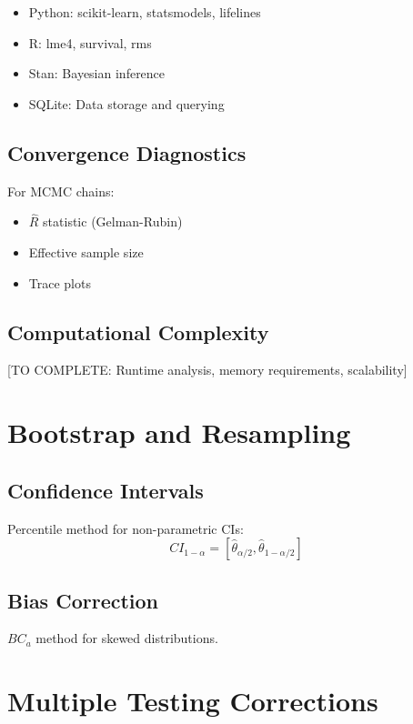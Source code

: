\begin{itemize}
\item Python: scikit-learn, statsmodels, lifelines
\item R: lme4, survival, rms
\item Stan: Bayesian inference
\item SQLite: Data storage and querying
\end{itemize}

\subsection{Convergence Diagnostics}

For MCMC chains:
\begin{itemize}
\item $\hat{R}$ statistic (Gelman-Rubin)
\item Effective sample size
\item Trace plots
\end{itemize}

\subsection{Computational Complexity}

[TO COMPLETE: Runtime analysis, memory requirements, scalability]

\section{Bootstrap and Resampling}

\subsection{Confidence Intervals}

Percentile method for non-parametric CIs:
\begin{equation}
CI_{1-\alpha} = [\hat{\theta}_{\alpha/2}, \hat{\theta}_{1-\alpha/2}]
\end{equation}

\subsection{Bias Correction}

$BC_a$ method for skewed distributions.

\section{Multiple Testing Corrections}

